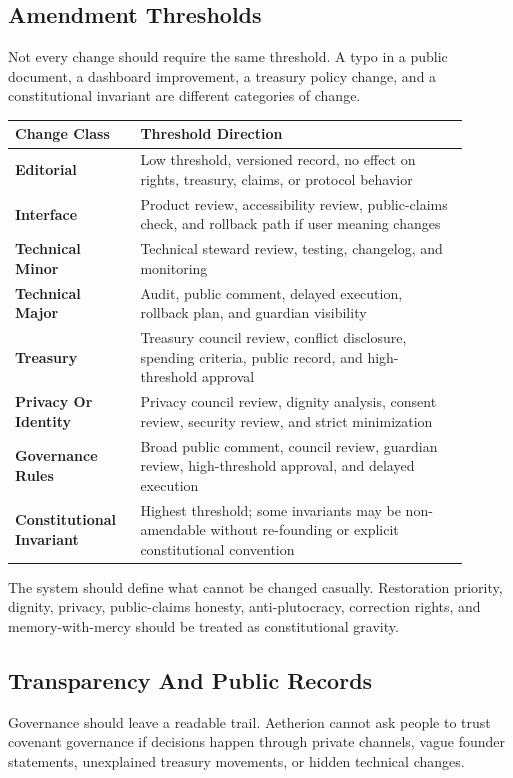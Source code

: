 \documentclass[12pt]{article}
\begin{document}
\subsection{Amendment Thresholds}

Not every change should require the same threshold. A typo in a public document, a dashboard improvement, a treasury policy change, and a constitutional invariant are different categories of change.

\begin{longtable}{>{\bfseries}p{0.24\linewidth}p{0.66\linewidth}}
\toprule
Change Class & Threshold Direction \\
\midrule
Editorial & Low threshold, versioned record, no effect on rights, treasury, claims, or protocol behavior \\
Interface & Product review, accessibility review, public-claims check, and rollback path if user meaning changes \\
Technical Minor & Technical steward review, testing, changelog, and monitoring \\
Technical Major & Audit, public comment, delayed execution, rollback plan, and guardian visibility \\
Treasury & Treasury council review, conflict disclosure, spending criteria, public record, and high-threshold approval \\
Privacy Or Identity & Privacy council review, dignity analysis, consent review, security review, and strict minimization \\
Governance Rules & Broad public comment, council review, guardian review, high-threshold approval, and delayed execution \\
Constitutional Invariant & Highest threshold; some invariants may be non-amendable without re-founding or explicit constitutional convention \\
\bottomrule
\end{longtable}

The system should define what cannot be changed casually. Restoration priority, dignity, privacy, public-claims honesty, anti-plutocracy, correction rights, and memory-with-mercy should be treated as constitutional gravity.

\subsection{Transparency And Public Records}

Governance should leave a readable trail. Aetherion cannot ask people to trust covenant governance if decisions happen through private channels, vague founder statements, unexplained treasury movements, or hidden technical changes.
\end{document}
